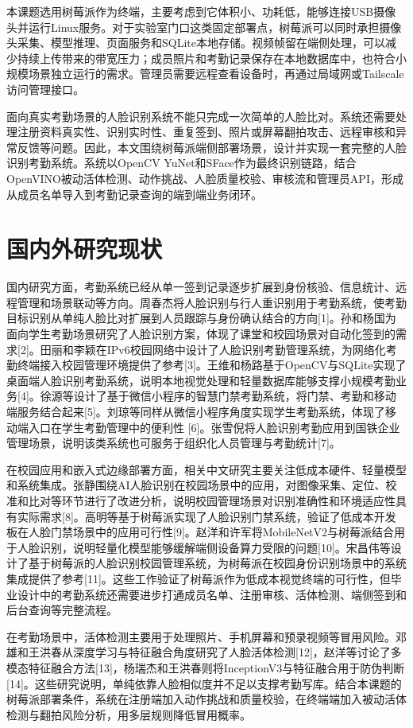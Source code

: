 \documentclass[UTF8]{heuthesis}
\begin{document}
本课题选用树莓派作为终端，主要考虑到它体积小、功耗低，能够连接USB摄像头并运行Linux服务。对于实验室门口这类固定部署点，树莓派可以同时承担摄像头采集、模型推理、页面服务和SQLite本地存储。视频帧留在端侧处理，可以减少持续上传带来的带宽压力；成员照片和考勤记录保存在本地数据库中，也符合小规模场景独立运行的需求。管理员需要远程查看设备时，再通过局域网或Tailscale访问管理接口。

面向真实考勤场景的人脸识别系统不能只完成一次简单的人脸比对。系统还需要处理注册资料真实性、识别实时性、重复签到、照片或屏幕翻拍攻击、远程审核和异常反馈等问题。因此，本文围绕树莓派端侧部署场景，设计并实现一套完整的人脸识别考勤系统。系统以OpenCV YuNet和SFace作为最终识别链路，结合OpenVINO被动活体检测、动作挑战、人脸质量校验、审核流和管理员API，形成从成员名单导入到考勤记录查询的端到端业务闭环。

\section{国内外研究现状}
国内研究方面，考勤系统已经从单一签到记录逐步扩展到身份核验、信息统计、远程管理和场景联动等方向。周春杰将人脸识别与行人重识别用于考勤系统，使考勤目标识别从单纯人脸比对扩展到人员跟踪与身份确认结合的方向[1]。孙和杨国为面向学生考勤场景研究了人脸识别方案，体现了课堂和校园场景对自动化签到的需求[2]。田丽和李颖在IPv6校园网络中设计了人脸识别考勤管理系统，为网络化考勤终端接入校园管理环境提供了参考[3]。王维和杨路基于OpenCV与SQLite实现了桌面端人脸识别考勤系统，说明本地视觉处理和轻量数据库能够支撑小规模考勤业务[4]。徐源等设计了基于微信小程序的智慧门禁考勤系统，将门禁、考勤和移动端服务结合起来[5]。刘琼等同样从微信小程序角度实现学生考勤系统，体现了移动端入口在学生考勤管理中的便利性 [6]。张雪倪将人脸识别考勤应用到国铁企业管理场景，说明该类系统也可服务于组织化人员管理与考勤统计[7]。

在校园应用和嵌入式边缘部署方面，相关中文研究主要关注低成本硬件、轻量模型和系统集成。张静围绕AI人脸识别在校园场景中的应用，对图像采集、定位、校准和比对等环节进行了改进分析，说明校园管理场景对识别准确性和环境适应性具有实际需求[8]。高明等基于树莓派实现了人脸识别门禁系统，验证了低成本开发板在人脸门禁场景中的应用可行性[9]。赵洋和许军将MobileNetV2与树莓派结合用于人脸识别，说明轻量化模型能够缓解端侧设备算力受限的问题[10]。宋昌伟等设计了基于树莓派的人脸识别校园管理系统，为树莓派在校园身份识别场景中的系统集成提供了参考[11]。这些工作验证了树莓派作为低成本视觉终端的可行性，但毕业设计中的考勤系统还需要进步打通成员名单、注册审核、活体检测、端侧签到和后台查询等完整流程。

在考勤场景中，活体检测主要用于处理照片、手机屏幕和预录视频等冒用风险。邓雄和王洪春从深度学习与特征融合角度研究了人脸活体检测[12]，赵洋等讨论了多模态特征融合方法[13]，杨瑞杰和王洪春则将InceptionV3与特征融合用于防伪判断[14]。这些研究说明，单纯依靠人脸相似度并不足以支撑考勤写库。结合本课题的树莓派部署条件，系统在注册端加入动作挑战和质量校验，在终端端加入被动活体检测与翻拍风险分析，用多层规则降低冒用概率。
\end{document}
